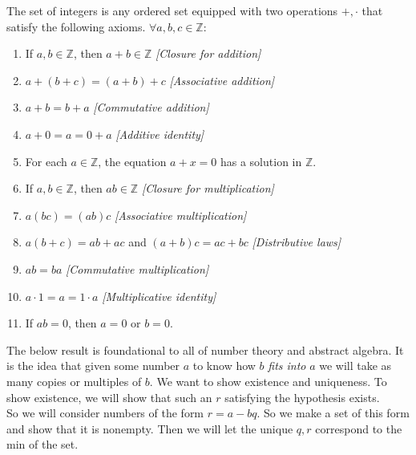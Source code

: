 \documentclass[../main.tex]{subfiles}
\begin{document}
\begin{definition}[$\mathbb{Z}$]
The set of integers is any ordered set equipped with two operations $+, \cdot$ that satisfy the following axioms. $\forall a,b,c \in \mathbb{Z}:$
\begin{enumerate}
    \item If $a, b \in \mathbb{Z}$, then $a + b \in \mathbb{Z}$ \hfill \textit{[Closure for addition]}
    \item $a + (b + c) = (a + b) + c$ \hfill \textit{[Associative addition]}
    \item $a + b = b + a$ \hfill \textit{[Commutative addition]}
    \item $a + 0 = a = 0 + a$ \hfill \textit{[Additive identity]}
    \item For each $a \in \mathbb{Z}$, the equation $a + x = 0$ has a solution in $\mathbb{Z}$.
    \item If $a, b \in \mathbb{Z}$, then $ab \in \mathbb{Z}$ \hfill \textit{[Closure for multiplication]}
    \item $a(bc) = (ab)c$ \hfill \textit{[Associative multiplication]}
    \item $a(b + c) = ab + ac$ and \newline
          \hspace{0.5cm} $(a + b)c = ac + bc$ \hfill \textit{[Distributive laws]}
    \item $ab = ba$ \hfill \textit{[Commutative multiplication]}
    \item $a \cdot 1 = a = 1 \cdot a$ \hfill \textit{[Multiplicative identity]}
    \item If $ab = 0$, then $a = 0$ or $b = 0$.







    
\end{enumerate}

\end{definition}



\begin{remark}
    The below result is foundational to all of number theory and abstract algebra. It is the idea that given some number \(a\) to know how \(b\) \textit{fits into} \(a\) we will take as many copies or multiples of \(b\). We want to show existence and uniqueness. To show existence, we will show that such an \(r\) satisfying the hypothesis exists.\\
    So we will consider numbers of the form \(r = a-bq\). So we make a set of this form and show that it is nonempty. Then we will let the unique \(q, r\) correspond to the min of the set.
\end{remark}
\end{document}
